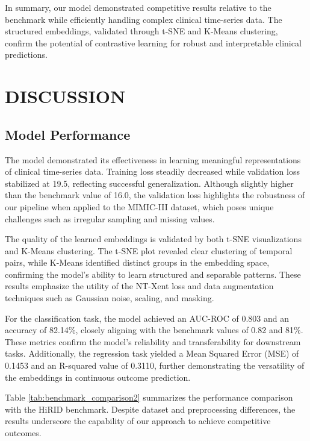 \documentclass[twocolumn]{article}
\begin{document}
    In summary, our model demonstrated competitive results relative to the benchmark
    while efficiently handling complex clinical time-series data. The structured
    embeddings, validated through t-SNE and K-Means clustering, confirm the
    potential of contrastive learning for robust and interpretable clinical
    predictions.

    \section{ \large DISCUSSION}

    \subsection{Model Performance}

    The model demonstrated its effectiveness in learning meaningful
    representations of clinical time-series data. Training loss steadily decreased
    while validation loss stabilized at 19.5, reflecting successful
    generalization. Although slightly higher than the benchmark value of 16.0,
    the validation loss highlights the robustness of our pipeline when applied
    to the MIMIC-III dataset, which poses unique challenges such as irregular sampling
    and missing values.

    The quality of the learned embeddings is validated by both t-SNE visualizations
    and K-Means clustering. The t-SNE plot revealed clear clustering of temporal
    pairs, while K-Means identified distinct groups in the embedding space,
    confirming the model’s ability to learn structured and separable patterns. These
    results emphasize the utility of the NT-Xent loss and data augmentation techniques
    such as Gaussian noise, scaling, and masking.

    For the classification task, the model achieved an AUC-ROC of 0.803 and an
    accuracy of 82.14\%, closely aligning with the benchmark values of 0.82 and
    81\%. These metrics confirm the model's reliability and transferability for
    downstream tasks. Additionally, the regression task yielded a Mean Squared
    Error (MSE) of 0.1453 and an R-squared value of 0.3110, further demonstrating
    the versatility of the embeddings in continuous outcome prediction.

    Table \ref{tab:benchmark_comparison2} summarizes the performance comparison with
    the HiRID benchmark. Despite dataset and preprocessing differences, the results
    underscore the capability of our approach to achieve competitive outcomes.
\end{document}
